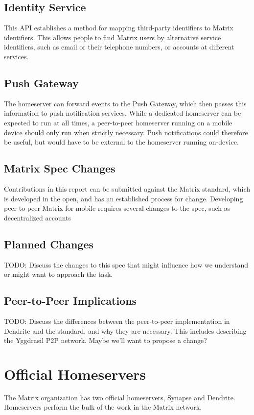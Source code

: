 \subsection{Identity Service}
This \ac{API} establishes a method for mapping third-party identifiers to Matrix identifiers.
This allows people to find Matrix users by alternative service identifiers, such as email or their telephone numbers, or accounts at different services.

\subsection{Push Gateway}
The homeserver can forward events to the Push Gateway, which then passes this information to push notification services.
While a dedicated homeserver can be expected to run at all times, a peer-to-peer homeserver running on a mobile device should only run when strictly necessary.
Push notifications could therefore be useful, but would have to be external to the homeserver running on-device.


\subsection{Matrix Spec Changes}


Contributions in this report can be submitted against the Matrix standard, which is developed in the open, and has an established process for change\cite{matrix_org_spec_changes}.
Developing peer-to-peer Matrix for mobile requires several changes to the spec, such as decentralized accounts

\subsection{Planned Changes}
TODO:
    Discuss the changes to this spec that might influence how we understand or might want to approach the task.

\subsection{Peer-to-Peer Implications}
TODO: 
    Discuss the differences between the peer-to-peer implementation in Dendrite and the standard, and why they are necessary.
    This includes describing the Yggdrasil P2P network.
    Maybe we'll want to propose a change?

\section{Official Homeservers}
The Matrix organization has two official homeservers, Synapse\cite{matrix_org_synapse} and Dendrite\cite{matrix_org_dendrite}.
Homeservers perform the bulk of the work in the Matrix network.

